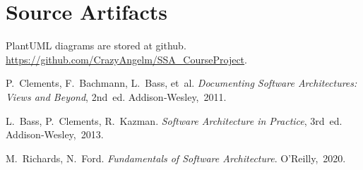 \documentclass[11pt,a4paper]{article}
\begin{document}
\section{Source Artifacts}
PlantUML diagrams are stored at github.
\url{https://github.com/CrazyAngelm/SSA_CourseProject}.

\begin{thebibliography}{9}
P. Clements, F. Bachmann, L. Bass, et al.  
\textit{Documenting Software Architectures: Views and Beyond}, 2nd ed.  
Addison‑Wesley, 2011.

L. Bass, P. Clements, R. Kazman.  
\textit{Software Architecture in Practice}, 3rd ed.  
Addison‑Wesley, 2013.

M. Richards, N. Ford.  
\textit{Fundamentals of Software Architecture}.  
O’Reilly, 2020.
\end{thebibliography}
\end{document}
